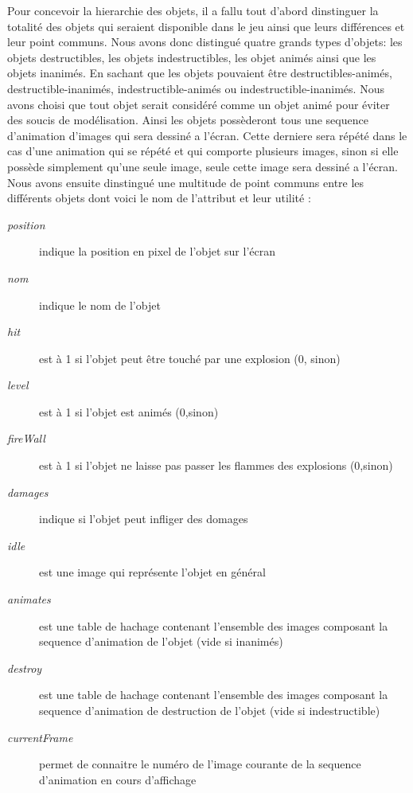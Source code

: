 	Pour concevoir la hierarchie des objets, il a fallu tout d'abord dinstinguer la totalité des objets qui seraient disponible dans le jeu ainsi que leurs différences et leur point communs.  Nous avons donc distingué quatre grands types d'objets: les objets destructibles, les objets indestructibles, les objet animés ainsi que les objets inanimés. En sachant que les objets pouvaient être destructibles-animés, destructible-inanimés, indestructible-animés ou indestructible-inanimés. Nous avons choisi que tout objet serait considéré comme un objet animé pour éviter des soucis de modélisation. Ainsi les objets possèderont tous une sequence d'animation d'images qui sera dessiné a l'écran. Cette derniere sera répété dans le cas d'une animation qui se répété et qui comporte plusieurs images, sinon si elle possède simplement qu'une seule image, seule cette image sera dessiné a l'écran. Nous avons ensuite dinstingué une multitude de point communs entre les différents objets dont voici le nom de l'attribut et leur utilité : 
	
	\begin{description}
		\item [\textit{position}]{indique la position en pixel de l'objet sur l'écran}
		\item [\textit{nom}]{indique le nom de l'objet}
		\item [\textit{hit}]{est à 1 si l'objet peut être touché par une explosion (0, sinon)}
		\item [\textit{level}]{est à 1 si l'objet est animés (0,sinon)}
		\item [\textit{fireWall}]{est à 1 si l'objet ne laisse pas passer les flammes des explosions (0,sinon)}
		\item [\textit{damages}]{indique si l'objet peut infliger des domages}
		\item [\textit{idle}]{est une image qui représente l'objet en général}
		\item [\textit{animates}]{est une table de hachage contenant l'ensemble des images composant la sequence d'animation de l'objet (vide si inanimés)}
		\item [\textit{destroy}]{est une table de hachage contenant l'ensemble des images composant la sequence d'animation de destruction de l'objet (vide si indestructible)}
		\item [\textit{currentFrame}]{permet de connaitre le numéro de l'image courante de la sequence d'animation en cours d'affichage}
	\end{description}

